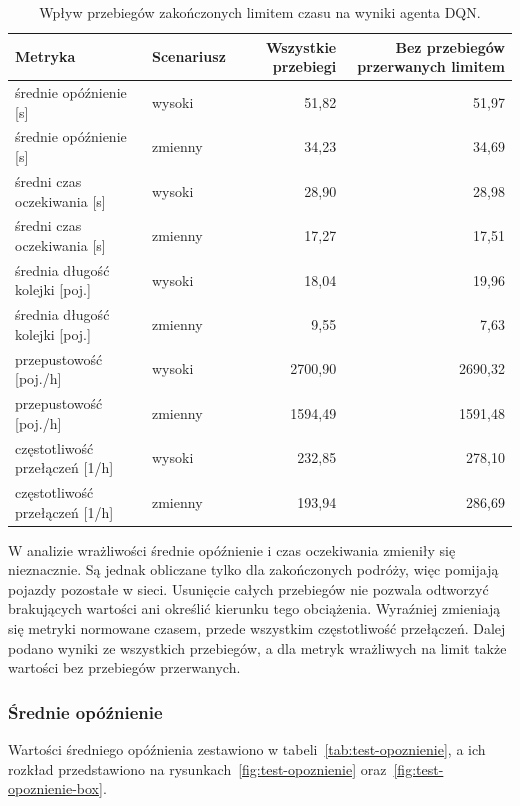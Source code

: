\begin{table}[htbp] \centering
    \caption{Wpływ przebiegów zakończonych limitem czasu na wyniki agenta DQN.}
    \label{tab:blokady}
    \footnotesize
    \setlength{\tabcolsep}{3pt}
    \begin{tabular}{| l | l | r | r |} \hline
        Metryka & Scenariusz & Wszystkie przebiegi & Bez przebiegów przerwanych limitem \\ \hline\hline
        średnie opóźnienie [s]      & wysoki  & 51,82   & 51,97 \\ \hline
        średnie opóźnienie [s]      & zmienny & 34,23   & 34,69 \\ \hline
        średni czas oczekiwania [s] & wysoki  & 28,90   & 28,98 \\ \hline
        średni czas oczekiwania [s] & zmienny & 17,27   & 17,51 \\ \hline
        średnia długość kolejki [poj.] & wysoki  & 18,04   & 19,96 \\ \hline
        średnia długość kolejki [poj.] & zmienny & 9,55    & 7,63 \\ \hline
        przepustowość [poj./h]      & wysoki  & 2700,90 & 2690,32 \\ \hline
        przepustowość [poj./h]      & zmienny & 1594,49 & 1591,48 \\ \hline
        częstotliwość przełączeń [1/h] & wysoki  & 232,85  & 278,10 \\ \hline
        częstotliwość przełączeń [1/h] & zmienny & 193,94  & 286,69 \\ \hline
    \end{tabular}
\end{table}

W analizie wrażliwości średnie opóźnienie i czas oczekiwania zmieniły się nieznacznie. Są jednak obliczane tylko dla zakończonych podróży, więc pomijają pojazdy pozostałe w sieci. Usunięcie całych przebiegów nie pozwala odtworzyć brakujących wartości ani określić kierunku tego obciążenia. Wyraźniej zmieniają się metryki normowane czasem, przede wszystkim częstotliwość przełączeń. Dalej podano wyniki ze wszystkich przebiegów, a dla metryk wrażliwych na limit także wartości bez przebiegów przerwanych.

\subsubsection{Średnie opóźnienie}
\label{subsubsec:test-opoznienie}

Wartości średniego opóźnienia zestawiono w tabeli~\ref{tab:test-opoznienie}, a ich rozkład przedstawiono na rysunkach~\ref{fig:test-opoznienie} oraz~\ref{fig:test-opoznienie-box}.

